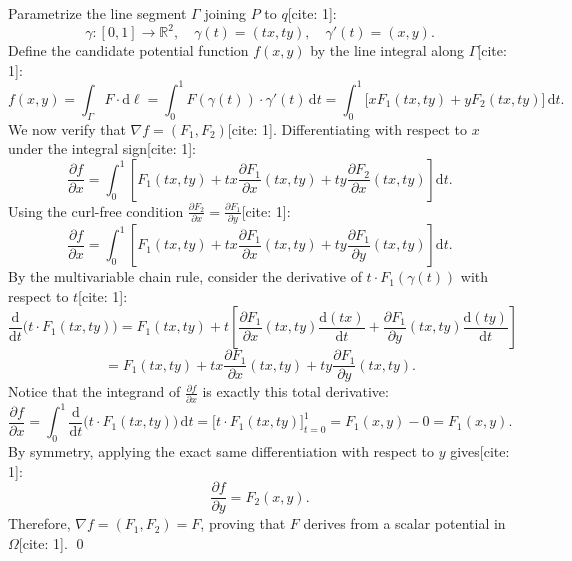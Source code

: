 Parametrize the line segment $\Gamma$ joining $P$ to $q$[cite: 1]:
\[
\gamma \colon [0, 1] \to \mathbb{R}^2, \quad \gamma(t) = (tx, ty), \quad \gamma'(t) = (x, y).
\]
Define the candidate potential function $f(x, y)$ by the line integral along $\Gamma$[cite: 1]:
\[
f(x, y) = \int_{\Gamma} F \cdot \mathrm{d}\ell = \int_0^1 F(\gamma(t)) \cdot \gamma'(t)\,\mathrm{d}t = \int_0^1 \big[ x F_1(tx, ty) + y F_2(tx, ty) \big]\,\mathrm{d}t.
\]
We now verify that $\nabla f = (F_1, F_2)$[cite: 1]. Differentiating with respect to $x$ under the integral sign[cite: 1]:
\[
\frac{\partial f}{\partial x} = \int_0^1 \left[ F_1(tx, ty) + tx \frac{\partial F_1}{\partial x}(tx, ty) + ty \frac{\partial F_2}{\partial x}(tx, ty) \right] \mathrm{d}t.
\]
Using the curl-free condition $\frac{\partial F_2}{\partial x} = \frac{\partial F_1}{\partial y}$[cite: 1]:
\[
\frac{\partial f}{\partial x} = \int_0^1 \left[ F_1(tx, ty) + tx \frac{\partial F_1}{\partial x}(tx, ty) + ty \frac{\partial F_1}{\partial y}(tx, ty) \right] \mathrm{d}t.
\]
By the multivariable chain rule, consider the derivative of $t \cdot F_1(\gamma(t))$ with respect to $t$[cite: 1]:
\[
\frac{\mathrm{d}}{\mathrm{d}t} \big( t \cdot F_1(tx, ty) \big) = F_1(tx, ty) + t \left[ \frac{\partial F_1}{\partial x}(tx, ty) \frac{\mathrm{d}(tx)}{\mathrm{d}t} + \frac{\partial F_1}{\partial y}(tx, ty) \frac{\mathrm{d}(ty)}{\mathrm{d}t} \right]
\]
\[
= F_1(tx, ty) + tx \frac{\partial F_1}{\partial x}(tx, ty) + ty \frac{\partial F_1}{\partial y}(tx, ty).
\]
Notice that the integrand of $\frac{\partial f}{\partial x}$ is exactly this total derivative:
\[
\frac{\partial f}{\partial x} = \int_0^1 \frac{\mathrm{d}}{\mathrm{d}t} \big( t \cdot F_1(tx, ty) \big)\,\mathrm{d}t = \Big[ t \cdot F_1(tx, ty) \Big]_{t=0}^1 = F_1(x, y) - 0 = F_1(x, y).
\]
By symmetry, applying the exact same differentiation with respect to $y$ gives[cite: 1]:
\[
\frac{\partial f}{\partial y} = F_2(x, y).
\]
Therefore, $\nabla f = (F_1, F_2) = F$, proving that $F$ derives from a scalar potential in $\Omega$[cite: 1]. \qed